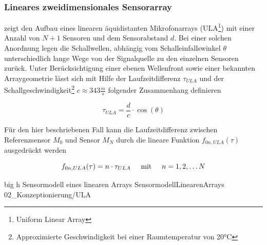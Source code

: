 \subsubsection{Lineares zweidimensionales Sensorarray}
\label{subsubsec:linearesArray}
 zeigt den Aufbau eines linearen äquidistanten Mikrofonarrays (ULA\footnote{Uniform Linear Array}) mit einer Anzahl von $N+1$ Sensoren und dem Sensorabstand $d$. Bei einer solchen Anordnung legen die Schallwellen, abhängig vom Schalleinfallswinkel $\theta$ unterschiedlich lange Wege von der Signalquelle zu den einzelnen Sensoren zurück. Unter Berücksichtigung einer ebenen Wellenfront sowie einer bekannten Arraygeometrie lässt sich mit Hilfe der Laufzeitdifferenz $\tau_{ULA}$ und der Schallgeschwindigkeit\footnote{Approximierte Geschwindigkeit bei einer Raumtemperatur von 20°C} $c \approx 343 \frac{m}{s}$ folgender Zusammenhang definieren

\begin{equation}\label{eq:ULA_1}
    \tau_{ULA}= \frac{d}{c} \cdot \cos(\theta)
\end{equation}

Für den hier beschriebenen Fall kann die Laufzeitdifferenz zwischen Referenzsensor $M_0$ und Sensor $M_N$ durch die lineare Funktion $f_{0n,ULA}(\tau)$ ausgedrückt werden


\begin{equation}\label{eq:ULA_2}
    f_{0n,ULA}(\tau) = n \cdot \tau_{ULA} \hspace{0.5cm} \text{mit} \hspace{0.5cm} n=1,2, \dots N
\end{equation}





         {big}                                       %
         {h}                                         %
         {Sensormodell eines linearen Arrays}        %
         {SensormodellLinearenArrays}                %
         {02_Konzeptionierung/ULA}                   %
         

